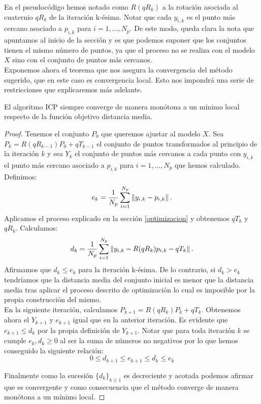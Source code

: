 En el pseudocódigo hemos notado como $  R(qR_{k}) $ a la rotación asociada al cuaternio $ qR_{k} $ de la iteración k-ésima. Notar que cada $ y_{i,k} $ es el punto más cercano asociado a $ p_{i,k} $ para $ i = 1,\dots, N_p $. De este modo, queda clara la nota que apuntamos al inicio de la sección y es que podemos suponer que los conjuntos tienen el mismo número de puntos, ya que el proceso no se realiza con el modelo $ X $ sino con el conjunto de puntos más cercanos. \\
 
Exponemos ahora el teorema que nos asegura la convergencia del método sugerido, que en este caso es convergencia local. Esto nos impondrá una serie de restricciones que explicaremos más adelante.

\bigskip
\begin{teoremaBox}
El algoritmo ICP siempre converge de manera monótona a un mínimo local respecto de la función objetivo distancia media.
\end{teoremaBox}
\begin{proof}
Tenemos el conjunto $ P_0 $ que queremos ajustar al modelo $ X $. Sea $ P_k = R(qR_{k-1})P_0 + qT_{k-1}$ el conjunto de puntos transformados al principio de la iteración $ k $ y sea $ Y_k $ el conjunto de puntos más cercanos a cada punto con $ y_{i,k} $ el punto más cercano asociado a $ p_{i,k} $ para $ i = 1,\dots, N_p $ que hemos calculado. Definimos:
\[
e_k = \frac{1}{N_p} \sum_{i=1}^{N_p} \left\Vert y_{i,k}-p_{i,k}\right\Vert.
\]
Aplicamos el proceso explicado en la sección \ref{optimizacion} y obtenemos $ qT_{k} $ y $ qR_{k} $. Calculamos:
\[
d_k = \frac{1}{N_p} \sum_{i=1}^{N_p} \left\Vert y_{i,k}-R(qR_{k})p_{i,k}-qT_{k}\right\Vert.
\]
Afirmamos que $ d_k \leq e_k $ para la iteración k-ésima. De lo contrario, si $ d_k > e_k $ tendríamos que la distancia media del conjunto inicial es menor que la distancia media tras aplicar el proceso descrito de optimización lo cual es imposible por la propia construcción del mismo. \\

En la siguiente iteración, calculamos $ P_{k+1} = R(qR_{k})P_k + qT_{k} $. Obtenemos ahora el $ Y_{k+1} $ y $ e_{k+1} $ igual que en la anterior iteración. Es evidente que $ e_{k+1} \leq d_k $ por la propia definición de $ Y_{k+1} $. Notar que para toda iteración $ k $ se cumple $ e_k, d_k \geq 0 $ al ser la suma de números no negativos por lo que hemos conseguido la siguiente relación:
\[
0\leq d_{k+1} \leq e_{k+1} \leq d_k \leq e_k
\]

Finalmente como la sucesión $ \{d_k\}_{k \geq 1} $ es decreciente y acotada podemos afirmar que es convergente y como consecuencia que el método converge de manera monótona a un mínimo local.
\end{proof}

